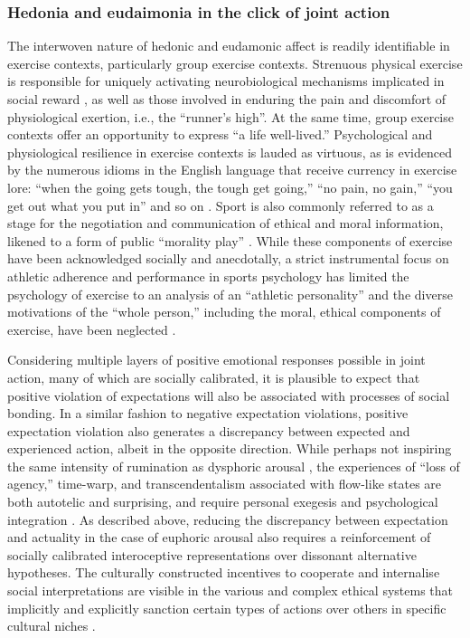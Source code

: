 \subsubsection{Hedonia and eudaimonia in the click of joint action}
  The interwoven nature of hedonic and eudamonic affect is readily identifiable in exercise contexts, particularly group exercise contexts.  Strenuous physical exercise is responsible for uniquely activating neurobiological mechanisms implicated in social reward \citep{Dunbar2010,Eisenberger2012}, as well as those involved in enduring the pain and discomfort of physiological exertion, i.e., the ``runner’s high''\citep{Boecker2008,Dietrich2004,Sullivan2014,Tarr2015}. At the same time, group exercise contexts offer an opportunity to express ``a life well-lived.''  Psychological and physiological resilience in exercise contexts is lauded as virtuous, as is evidenced by the numerous idioms in the English language that receive currency in exercise lore: ``when the going gets tough, the tough get going,'' ``no pain, no gain,'' ``you get out what you put in'' and so on \citep{Sarkar2014}.  Sport is also commonly referred to as a stage for the negotiation and communication of ethical and moral information, likened to a form of public ``morality play'' \citep{McNamee2008}.  While these components of exercise have been acknowledged socially and anecdotally, a strict instrumental focus on athletic adherence and performance in sports psychology has limited the psychology of exercise to an analysis of an ``athletic personality'' and the diverse motivations of the ``whole person,'' including the moral, ethical components of exercise, have been neglected \citep{Beedie2015,Coulter2015,Laborde2014}.

Considering multiple layers of positive emotional responses possible in joint action, many of which are socially calibrated, it is plausible to expect that positive violation of expectations will also be associated with processes of social bonding.  In a similar fashion to negative expectation violations, positive expectation violation also generates a discrepancy between expected and experienced action, albeit in the opposite direction.  While perhaps not inspiring the same intensity of rumination as dysphoric arousal \citep{Russell2014}, the experiences of ``loss of agency,'' time-warp, and transcendentalism associated with flow-like states are both autotelic and surprising, and require personal exegesis and psychological integration \citep{Jackson1995,Whitehouse2004}.  As described above, reducing the discrepancy between expectation and actuality in the case of euphoric arousal also requires a reinforcement of socially calibrated interoceptive representations over dissonant alternative hypotheses.   The culturally constructed incentives to cooperate and internalise social interpretations are visible in the various and complex ethical systems that implicitly and explicitly sanction certain types of actions over others in specific cultural niches \citep{Slingerland2014}.



